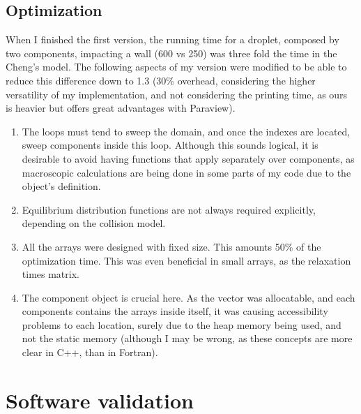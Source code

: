 \documentclass{article}
\begin{document}
	\subsection{Optimization}
	When I finished the first version, the running time for a droplet, composed by two components, impacting a wall (600 vs 250) was three fold the time in the Cheng's model. The following aspects of my version were modified to be able to reduce this difference down to 1.3 (30\% overhead, considering the higher versatility of my implementation, and not considering the printing time, as ours is heavier but offers great advantages with Paraview). 
	\begin{enumerate}
		\item The loops must tend to sweep the domain, and once the indexes are located, sweep components inside this loop. Although this sounds logical, it is desirable to avoid having functions that apply separately over components, as macroscopic calculations are being done in some parts of my code due to the object's definition. 
		\item Equilibrium distribution functions are not always required explicitly, depending on the collision model. 
		\item All the arrays were designed with fixed size. This amounts 50\% of the optimization time. This was even beneficial in small arrays, as the relaxation times matrix. 
		\item The component object is crucial here. As the vector was allocatable, and each components contains the arrays inside itself, it was causing accessibility problems to each location, surely due to the heap memory being used, and not the static memory (although I may be wrong, as these concepts are more clear in C++, than in Fortran).
	\end{enumerate}

	\section{Software validation}
	
\end{document}
